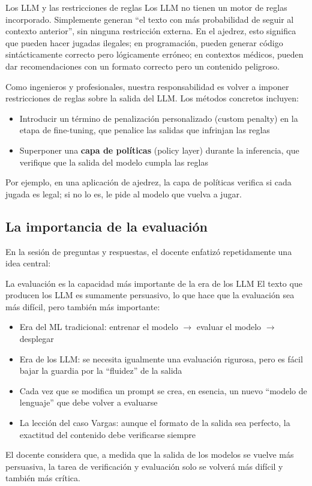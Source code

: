 \documentclass[a4paper]{article}
\begin{document}
\begin{knowledgebox}{Los LLM y las restricciones de reglas}
Los LLM no tienen un motor de reglas incorporado. Simplemente generan ``el texto con más probabilidad de seguir al contexto anterior'', sin ninguna restricción externa. En el ajedrez, esto significa que pueden hacer jugadas ilegales; en programación, pueden generar código sintácticamente correcto pero lógicamente erróneo; en contextos médicos, pueden dar recomendaciones con un formato correcto pero un contenido peligroso.

Como ingenieros y profesionales, nuestra responsabilidad es volver a imponer restricciones de reglas sobre la salida del LLM. Los métodos concretos incluyen:
\begin{itemize}
    \item Introducir un término de penalización personalizado (custom penalty) en la etapa de fine-tuning, que penalice las salidas que infrinjan las reglas
    \item Superponer una \textbf{capa de políticas} (policy layer) durante la inferencia, que verifique que la salida del modelo cumpla las reglas
\end{itemize}
Por ejemplo, en una aplicación de ajedrez, la capa de políticas verifica si cada jugada es legal; si no lo es, le pide al modelo que vuelva a jugar.
\end{knowledgebox}

\subsection{La importancia de la evaluación}

En la sesión de preguntas y respuestas, el docente enfatizó repetidamente una idea central:

\begin{importantbox}{La evaluación es la capacidad más importante de la era de los LLM}
El texto que producen los LLM es sumamente persuasivo, lo que hace que la evaluación sea más difícil, pero también más importante:
\begin{itemize}
    \item Era del ML tradicional: entrenar el modelo $\rightarrow$ evaluar el modelo $\rightarrow$ desplegar
    \item Era de los LLM: se necesita igualmente una evaluación rigurosa, pero es fácil bajar la guardia por la ``fluidez'' de la salida
    \item Cada vez que se modifica un prompt se crea, en esencia, un nuevo ``modelo de lenguaje'' que debe volver a evaluarse
    \item La lección del caso Vargas: aunque el formato de la salida sea perfecto, la exactitud del contenido debe verificarse siempre
\end{itemize}
El docente considera que, a medida que la salida de los modelos se vuelve más persuasiva, la tarea de verificación y evaluación solo se volverá más difícil y también más crítica.
\end{importantbox}
\end{document}
